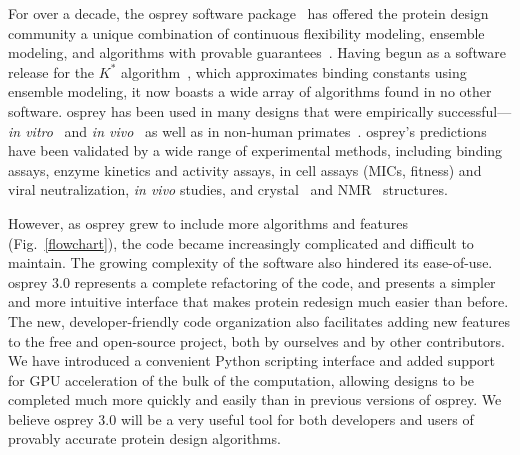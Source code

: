 For over a decade, the {\sc osprey} software package~\cite{OSPREY_MIE,minDEE,OSPREY_MIE,OSPREY} has offered the protein design community a unique combination of continuous flexibility modeling, ensemble modeling, and algorithms with provable guarantees~\cite{alg_SMB_textbook,cosb_design}.  Having begun as a software release for the $K^*$ algorithm~\cite{minDEE,GrsA-LeuA}, which approximates binding constants using ensemble modeling, it now boasts a wide array of algorithms found in no other software.  {\sc osprey} has been used in many designs that were empirically successful---\textit{in vitro}~\cite{VRC07_enhance,CFTR,runx1_cbfb,GrsA-LeuA,DHFR-PNAS,GrsA-TyrA,specific_probes} and \textit{in vivo}~\cite{VRC07_enhance,CFTR,runx1_cbfb,DHFR-PNAS} as well as in non-human primates~\cite{VRC07_enhance}.  {\sc osprey}'s predictions have been validated by a wide range of experimental methods, including binding assays, enzyme kinetics and activity assays, in cell assays (MICs, fitness) and viral neutralization, {\em in vivo} studies, and crystal~\cite{DHFR-PNAS2, VRC07_enhance} and NMR~\cite{runx1_cbfb} structures.    

However, as {\sc osprey} grew to include more algorithms and features (Fig.~\ref{flowchart}), the code became increasingly complicated and difficult to maintain.  The growing complexity of the software also hindered its ease-of-use. {\sc osprey} 3.0 represents a complete refactoring of the code, and presents a simpler and more intuitive interface that makes protein redesign much easier than before. The new, developer-friendly code organization also facilitates adding new features to the free and open-source \osprey project, both by ourselves and by other contributors.  We have introduced a convenient Python scripting interface and added support for GPU acceleration of the bulk of the computation, allowing designs to be completed much more quickly and easily than in previous versions of {\sc osprey}.  We believe {\sc osprey} 3.0 will be a very useful tool for both developers and users of provably accurate protein design algorithms.  



